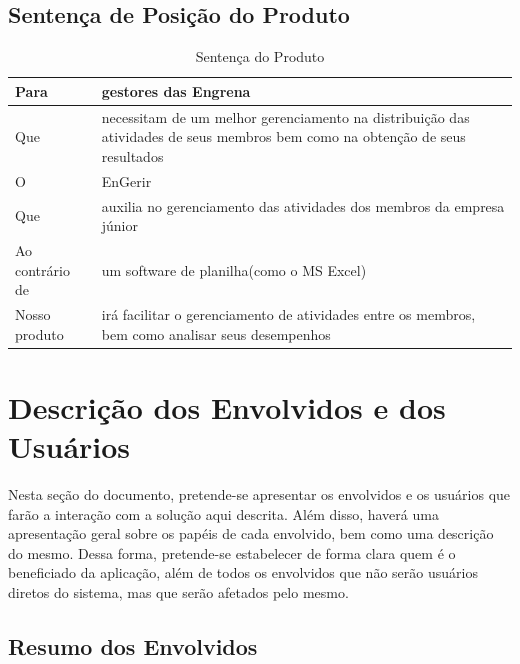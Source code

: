 \begin{apendicesenv}
\pagebreak
\clearpage
\newpage

\subsection{Sentença de Posição do Produto}

\begin{table}[!h]
\centering
\caption{Sentença do Produto}
\label{product}
\begin{tabular}{|p{7cm}|p{7cm}|}
\hline
Para            & gestores das Engrena                                                                                                         \\ \hline
Que             & necessitam de um melhor gerenciamento na distribuição das atividades de seus membros bem como na obtenção de seus resultados \\ \hline
O               & EnGerir                                                                                                                      \\ \hline
Que             & auxilia no gerenciamento das atividades dos membros da empresa júnior                                                        \\ \hline
Ao contrário de & um software de planilha(como o MS Excel)                                                               \\ \hline
Nosso produto   & irá facilitar o gerenciamento de atividades entre os membros, bem como analisar seus desempenhos                             \\ \hline
\end{tabular}
\end{table}

\section{Descrição dos Envolvidos e dos Usuários}

Nesta seção do documento, pretende-se apresentar os envolvidos e os usuários que farão a interação com a solução aqui descrita. Além disso, haverá uma apresentação geral sobre os papéis de cada envolvido, bem como uma descrição do mesmo.
Dessa forma, pretende-se estabelecer de forma clara quem é o beneficiado da aplicação, além de todos os envolvidos que não serão usuários diretos do sistema, mas que serão afetados pelo mesmo.

\subsection{Resumo dos Envolvidos}


\end{apendicesenv}
